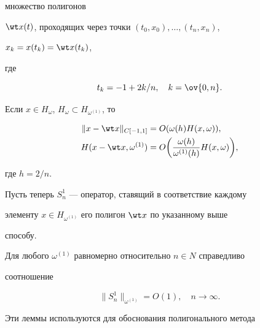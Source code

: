 множество полигонов 


$\wt x(t)$, проходящих через точки $(t_0,x_0),\dotsc,(t_n,x_n)$, 


$x_k=x(t_k)=\wt x(t_k)$,


где


\begin{equation}


t_k=-1+2k/n,\quad k=\ov{0,n}.


\end{equation}





\begin{lem}


Если $x\in H_\omega$, $H_\omega\subset H_{\omega^{(1)}}$, то


\begin{align*}


\|x-\wt x\|_{C[-1,1]}&=O(\omega(h)H(x,\omega)),\\


H(x-\wt x,\omega^{(1)})&=O\bigg(


\frac{\omega(h)}{\omega^{(1)}(h)}H(x,\omega)\bigg),


\end{align*}


где $h=2/n$.


\end{lem}





Пусть теперь $S^1_n$ --- оператор, ставящий в соответствие каждому 


элементу $x\in H_{\omega^{(1)}}$ его полигон $\wt x$ по указанному выше 


способу. 





\begin{lem}


Для любого $\omega^{(1)}$ равномерно относительно $n\in N$ справедливо 


соотношение


$$


\|S^1_n\|_{\omega^{(1)}}=O(1),\quad n\to\infty.


$$


\end{lem}





Эти леммы используются для обоснования полигонального метода 


